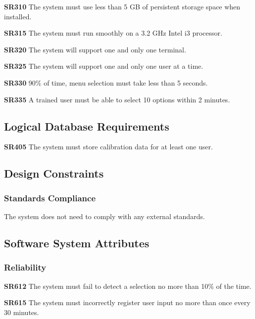 \documentclass{article}
\begin{document}
\textbf{SR310} The system must use less than 5 GB of persistent storage space when installed.

\textbf{SR315} The system must run smoothly on a 3.2 GHz Intel i3 processor.

\textbf{SR320} The system will support one and only one terminal.

\textbf{SR325} The system will support one and only one user at a time.

\textbf{SR330} 90\% of time, menu selection must take less than 5 seconds.

\textbf{SR335} A trained user must be able to select 10 options within 2
minutes.

\subsection{Logical Database Requirements}

\textbf{SR405} The system must store calibration data for at least one user.

\subsection{Design Constraints}


\subsubsection{Standards Compliance}

The system does not need to comply with any external standards.

\subsection{Software System Attributes}

\subsubsection{Reliability} 

\textbf{SR612} The system must fail to detect a selection no more than 10\% of
the time.

\textbf{SR615} The system must incorrectly register user input no more than
once every 30 minutes.
\end{document}
